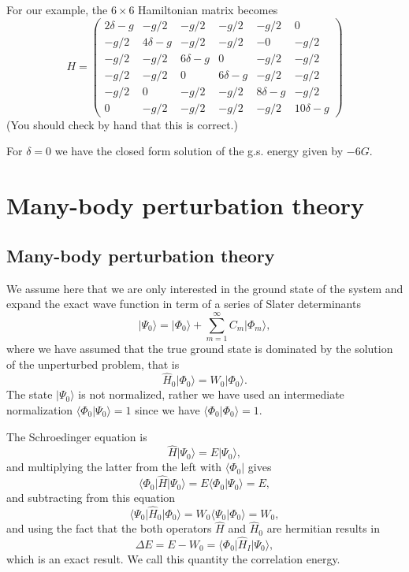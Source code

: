 \noindent
For our example, the $ 6 \times 6$  Hamiltonian matrix becomes
\[
H = \left ( 
\begin{array}{cccccc}
2\delta -g & -g/2 & -g/2 & -g/2 & -g/2 & 0 \\
 -g/2 & 4\delta -g & -g/2 & -g/2 & -0 & -g/2 \\
-g/2 & -g/2 & 6\delta -g & 0 & -g/2 & -g/2 \\
 -g/2 & -g/2 & 0 & 6\delta-g & -g/2 & -g/2 \\
 -g/2 & 0 & -g/2 & -g/2 & 8\delta-g & -g/2 \\
0 & -g/2 & -g/2 & -g/2 & -g/2 & 10\delta -g 
\end{array} \right )
\]
(You should check by hand that this is correct.) 

For $\delta = 0$ we have the closed form solution of  the g.s. energy given by $-6G$.

\section{Many-body perturbation theory}

\subsection{Many-body perturbation theory}

We assume here that we are only interested in the ground state of the system and 
expand the exact wave function in term of a series of Slater determinants
\[
\vert \Psi_0\rangle = \vert \Phi_0\rangle + \sum_{m=1}^{\infty}C_m\vert \Phi_m\rangle,
\]
where we have assumed that the true ground state is dominated by the 
solution of the unperturbed problem, that is
\[
\hat{H}_0\vert \Phi_0\rangle= W_0\vert \Phi_0\rangle.
\]
The state $\vert \Psi_0\rangle$ is not normalized, rather we have used an intermediate 
normalization $\langle \Phi_0 \vert \Psi_0\rangle=1$ since we have $\langle \Phi_0\vert \Phi_0\rangle=1$. 



The Schroedinger equation is
\[
\hat{H}\vert \Psi_0\rangle = E\vert \Psi_0\rangle,
\]
and multiplying the latter from the left with $\langle \Phi_0\vert $ gives
\[
\langle \Phi_0\vert \hat{H}\vert \Psi_0\rangle = E\langle \Phi_0\vert \Psi_0\rangle=E,
\]
and subtracting from this equation
\[
\langle \Psi_0\vert \hat{H}_0\vert \Phi_0\rangle= W_0\langle \Psi_0\vert \Phi_0\rangle=W_0,
\]
and using the fact that the both operators $\hat{H}$ and $\hat{H}_0$ are hermitian 
results in
\[
\Delta E=E-W_0=\langle \Phi_0\vert \hat{H}_I\vert \Psi_0\rangle,
\]
which is an exact result. We call this quantity the correlation energy.



